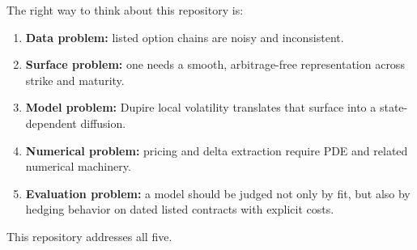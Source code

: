\documentclass[11pt]{article}
\begin{document}
The right way to think about this repository is:

\begin{enumerate}
  \item \textbf{Data problem:} listed option chains are noisy and inconsistent.
  \item \textbf{Surface problem:} one needs a smooth, arbitrage-free representation across strike and maturity.
  \item \textbf{Model problem:} Dupire local volatility translates that surface into a state-dependent diffusion.
  \item \textbf{Numerical problem:} pricing and delta extraction require PDE and related numerical machinery.
  \item \textbf{Evaluation problem:} a model should be judged not only by fit, but also by hedging behavior on dated listed contracts with explicit costs.
\end{enumerate}

This repository addresses all five.
\end{document}
